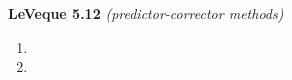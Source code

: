\textbf{LeVeque 5.12} \textit{(predictor-corrector methods)}

\begin{enumerate}
  \item 
  \pagebreak
  \item 
\end{enumerate} 